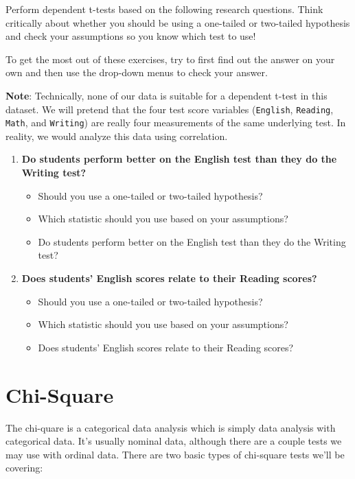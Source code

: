 \documentclass[
]{book}
\begin{document}
Perform dependent t-tests based on the following research questions. Think critically about whether you should be using a one-tailed or two-tailed hypothesis and check your assumptions so you know which test to use!

To get the most out of these exercises, try to first find out the answer on your own and then use the drop-down menus to check your answer.

\textbf{Note}: Technically, none of our data is suitable for a dependent t-test in this dataset. We will pretend that the four test score variables (\texttt{English}, \texttt{Reading}, \texttt{Math}, and \texttt{Writing}) are really four measurements of the same underlying test. In reality, we would analyze this data using correlation.

\begin{enumerate}
\def\labelenumi{\arabic{enumi}.}
\item
  \textbf{Do students perform better on the English test than they do the Writing test?}

  \begin{itemize}
  \item
    Should you use a one-tailed or two-tailed hypothesis?
  \item
    Which statistic should you use based on your assumptions?
  \item
    Do students perform better on the English test than they do the Writing test?
  \end{itemize}
\item
  \textbf{Does students' English scores relate to their Reading scores?}

  \begin{itemize}
  \item
    Should you use a one-tailed or two-tailed hypothesis?
  \item
    Which statistic should you use based on your assumptions?
  \item
    Does students' English scores relate to their Reading scores?
  \end{itemize}
\end{enumerate}

\hypertarget{chi-square}{%
\chapter{Chi-Square}\label{chi-square}}

The chi-quare is a categorical data analysis which is simply data analysis with categorical data. It's usually nominal data, although there are a couple tests we may use with ordinal data. There are two basic types of chi-square tests we'll be covering:
\end{document}
